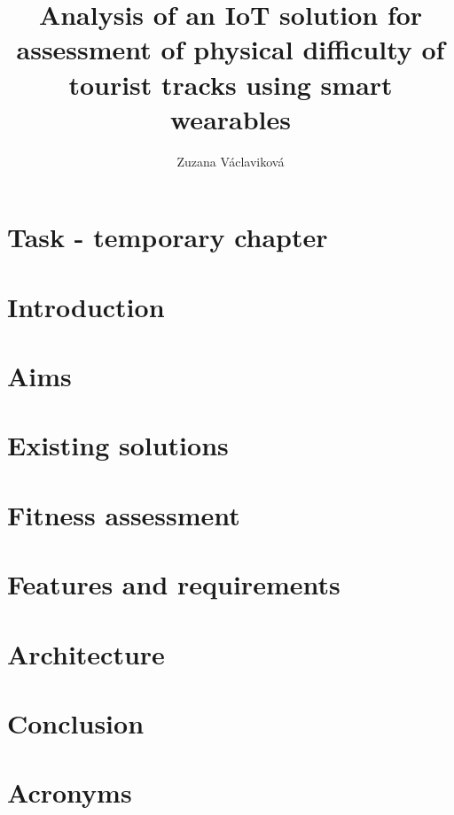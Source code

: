 \documentclass[thesis=B,english]{FITthesis}[2019/03/21]
\title{Analysis of an IoT solution for assessment of physical difficulty of tourist tracks using smart wearables}
\author{Zuzana Václaviková} %
\begin{document}


\chapter{Task - temporary chapter}


\chapter{Introduction}


\chapter{Aims}


\chapter{Existing solutions}

\chapter{Fitness assessment}

\chapter{Features and requirements}

\chapter{Architecture}


\chapter{Conclusion}





\appendix

\chapter{Acronyms}

\end{document}
